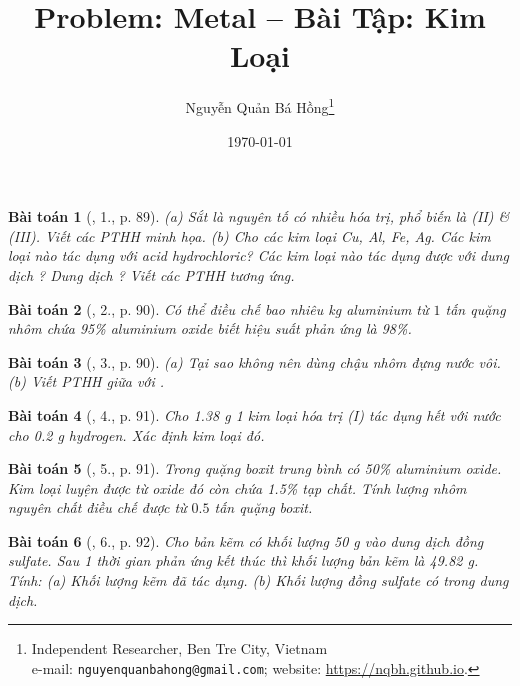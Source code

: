 \documentclass{article}
\title{Problem: Metal -- Bài Tập: Kim Loại}
\author{Nguyễn Quản Bá Hồng\footnote{Independent Researcher, Ben Tre City, Vietnam\\e-mail: \texttt{nguyenquanbahong@gmail.com}; website: \url{https://nqbh.github.io}.}}
\date{\today}
\newtheorem{baitoan}{Bài toán}
\begin{document}
\maketitle
\begin{abstract}
	
\end{abstract}
\setcounter{secnumdepth}{4}
\setcounter{tocdepth}{3}
\tableofcontents


\begin{baitoan}[\cite{An_Hoa_Hoc_nang_cao_8_9}, 1., p. 89]
	(a) Sắt là nguyên tố có nhiều hóa trị, phổ biến là (II) \& (III). Viết các {\rm PTHH} minh họa. (b) Cho các kim loại {\rm Cu, Al, Fe, Ag}. Các kim loại nào tác dụng với acid hydrochloric? Các kim loại nào tác dụng được với dung dịch {\rm{}}? Dung dịch {\rm{}}? Viết các {\rm PTHH} tương ứng.
\end{baitoan}

\begin{baitoan}[\cite{An_Hoa_Hoc_nang_cao_8_9}, 2., p. 90]
	Có thể điều chế bao nhiêu {\rm kg} aluminium từ $1$ tấn quặng nhôm chứa {\rm95\%} aluminium oxide biết hiệu suất phản ứng là {\rm98\%}.
\end{baitoan}

\begin{baitoan}[\cite{An_Hoa_Hoc_nang_cao_8_9}, 3., p. 90]
	(a) Tại sao không nên dùng chậu nhôm đựng nước vôi. (b) Viết PTHH giữa {\rm{}} với {\rm{}}.
\end{baitoan}

\begin{baitoan}[\cite{An_Hoa_Hoc_nang_cao_8_9}, 4., p. 91]
	Cho {\rm1.38 g} 1 kim loại hóa trị (I) tác dụng hết với nước cho {\rm0.2 g} hydrogen. Xác định kim loại đó.
\end{baitoan}

\begin{baitoan}[\cite{An_Hoa_Hoc_nang_cao_8_9}, 5., p. 91]
	Trong quặng boxit trung bình có {\rm50\%} aluminium oxide. Kim loại luyện được từ oxide đó còn chứa {\rm1.5\%} tạp chất. Tính lượng nhôm nguyên chất điều chế được từ $0.5$ tấn quặng boxit.
\end{baitoan}

\begin{baitoan}[\cite{An_Hoa_Hoc_nang_cao_8_9}, 6., p. 92]
	Cho bản kẽm có khối lượng {\rm50 g} vào dung dịch đồng sulfate. Sau 1 thời gian phản ứng kết thúc thì khối lượng bản kẽm là {\rm49.82 g}. Tính: (a) Khối lượng kẽm đã tác dụng. (b) Khối lượng đồng sulfate có trong dung dịch.
\end{baitoan}
\end{document}
